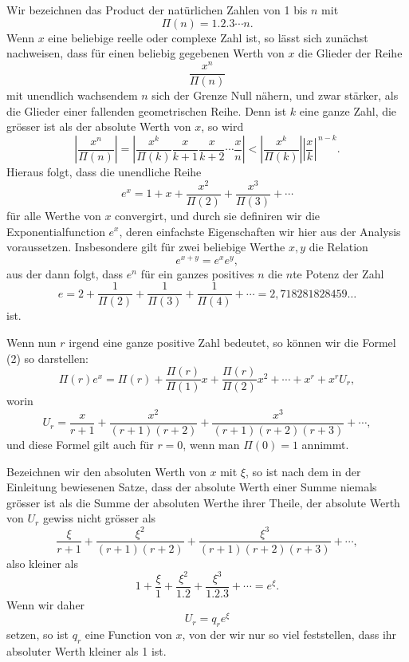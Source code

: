 \documentclass[11pt]{article}
\begin{document}
Wir bezeichnen das Product der natürlichen Zahlen von 1 bis $n$ mit
\[
\Pi(n)=1.2.3\cdots n.
\]
Wenn $x$ eine beliebige reelle oder complexe Zahl ist, so lässt sich zunächst nachweisen, dass für einen beliebig gegebenen Werth von $x$ die Glieder der Reihe
\begin{equation}\tag{1}
\frac{x^n}{\Pi(n)}
\end{equation}
mit unendlich wachsendem $n$ sich der Grenze Null nähern, und zwar stärker, als die Glieder einer fallenden geometrischen Reihe. Denn ist $k$ eine ganze Zahl, die grösser ist als der absolute Werth von $x$, so wird
\[
\left|\frac{x^n}{\Pi(n)}\right|
=
\left|\frac{x^k}{\Pi(k)}\frac{x}{k+1}\frac{x}{k+2}\cdots\frac{x}{n}\right|
<
\left|\frac{x^k}{\Pi(k)}\right|\left|\frac{x}{k}\right|^{\,n-k}.
\]
Hieraus folgt, dass die unendliche Reihe
\begin{equation}\tag{2}
e^x=1+x+\frac{x^2}{\Pi(2)}+\frac{x^3}{\Pi(3)}+\cdots
\end{equation}
für alle Werthe von $x$ convergirt, und durch sie definiren wir die Exponentialfunction $e^x$, deren einfachste Eigenschaften wir hier aus der Analysis voraussetzen. Insbesondere gilt für zwei beliebige Werthe $x,y$ die Relation
\[
e^{x+y}=e^x e^y,
\]
aus der dann folgt, dass $e^n$ für ein ganzes positives $n$ die $n$te Potenz der Zahl
\begin{equation}\tag{3}
e=2+\frac1{\Pi(2)}+\frac1{\Pi(3)}+\frac1{\Pi(4)}+\cdots
=2{,}718281828459\ldots
\end{equation}
ist.

Wenn nun $r$ irgend eine ganze positive Zahl bedeutet, so können wir die Formel (2) so darstellen:
\begin{equation}\tag{4}
\Pi(r)e^x=\Pi(r)+\frac{\Pi(r)}{\Pi(1)}x+\frac{\Pi(r)}{\Pi(2)}x^2+\cdots+x^r+x^rU_r,
\end{equation}
worin
\begin{equation}\tag{5}
U_r=\frac{x}{r+1}+\frac{x^2}{(r+1)(r+2)}+\frac{x^3}{(r+1)(r+2)(r+3)}+\cdots,
\end{equation}
und diese Formel gilt auch für $r=0$, wenn man $\Pi(0)=1$ annimmt.

Bezeichnen wir den absoluten Werth von $x$ mit $\xi$, so ist nach dem in der Einleitung bewiesenen Satze, dass der absolute Werth einer Summe niemals grösser ist als die Summe der absoluten Werthe ihrer Theile, der absolute Werth von $U_r$ gewiss nicht grösser als
\[
\frac{\xi}{r+1}
+\frac{\xi^2}{(r+1)(r+2)}
+\frac{\xi^3}{(r+1)(r+2)(r+3)}
+\cdots,
\]
also kleiner als
\[
1+\frac{\xi}{1}+\frac{\xi^2}{1.2}+\frac{\xi^3}{1.2.3}+\cdots=e^\xi.
\]
Wenn wir daher
\[
U_r=q_r e^\xi
\]
setzen, so ist $q_r$ eine Function von $x$, von der wir nur so viel feststellen, dass ihr absoluter Werth kleiner als 1 ist.
\end{document}
